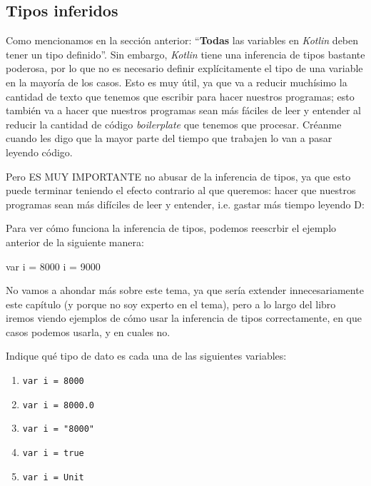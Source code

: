   \subsection{Tipos inferidos}
    Como mencionamos en la sección anterior: \enquote{\textbf{Todas} las variables en 
    \textit{Kotlin} deben tener un tipo definido}.
    Sin embargo, \textit{Kotlin} tiene una inferencia de tipos bastante poderosa, por lo que no es
    necesario definir explícitamente el tipo de una variable en la mayoría de los casos.
    Esto es muy útil, ya que va a reducir muchísimo la cantidad de texto que tenemos que escribir
    para hacer nuestros programas; esto también va a hacer que nuestros programas sean más fáciles
    de leer y entender al reducir la cantidad de código \textit{boilerplate} que tenemos que 
    procesar.
    Créanme cuando les digo que la mayor parte del tiempo que trabajen lo van a pasar leyendo 
    código.

    Pero ES MUY IMPORTANTE no abusar de la inferencia de tipos, ya que esto puede terminar teniendo
    el efecto contrario al que queremos: hacer que nuestros programas sean más difíciles de leer y
    entender, i.e. gastar más tiempo leyendo D:

    Para ver cómo funciona la inferencia de tipos, podemos reescrbir el ejemplo anterior de la
    siguiente manera:

    \begin{kotlin}
      var i = 8000
      i = 9000
    \end{kotlin}
    
    No vamos a ahondar más sobre este tema, ya que sería extender innecesariamente este capítulo (y
    porque no soy experto en el tema), pero a lo largo del libro iremos viendo ejemplos de cómo
    usar la inferencia de tipos correctamente, en que casos podemos usarla, y en cuales no.

    \begin{exercise}
      Indique qué tipo de dato es cada una de las siguientes variables:

      \begin{enumerate}
        \item \texttt{var i = 8000}
        \item \texttt{var i = 8000.0}
        \item \texttt{var i = "8000"}
        \item \texttt{var i = true}
        \item \texttt{var i = Unit}
      \end{enumerate}

    \end{exercise}

